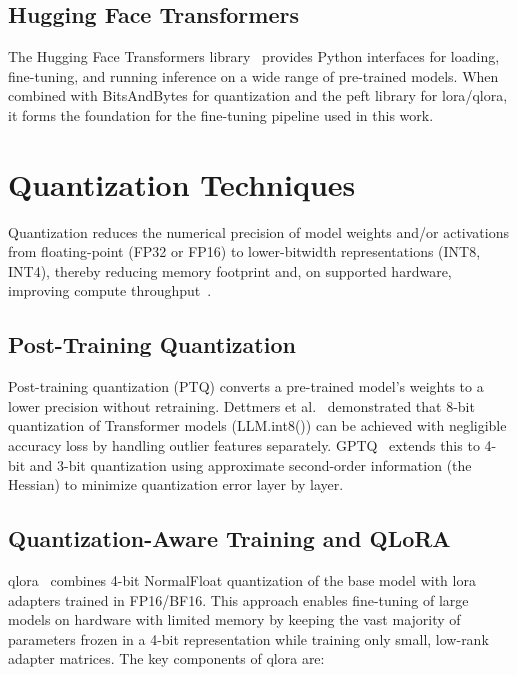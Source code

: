\documentclass[12pt,a4paper,oneside]{report}
\begin{document}
\subsection{Hugging Face Transformers}

The Hugging Face Transformers library~\cite{wolf2020transformers} provides Python interfaces for loading, fine-tuning, and running inference on a wide range of pre-trained models. When combined with BitsAndBytes for quantization and the \gls{peft} library for \gls{lora}/\gls{qlora}, it forms the foundation for the fine-tuning pipeline used in this work.


\section{Quantization Techniques}
\label{sec:sota-quantization}

Quantization reduces the numerical precision of model weights and/or activations from floating-point (FP32 or FP16) to lower-bitwidth representations (INT8, INT4), thereby reducing memory footprint and, on supported hardware, improving compute throughput~\cite{jacob2018quantization}.

\subsection{Post-Training Quantization}

Post-training quantization (PTQ) converts a pre-trained model's weights to a lower precision without retraining. Dettmers et al.~\cite{dettmers2022gpt3} demonstrated that 8-bit quantization of Transformer models (LLM.int8()) can be achieved with negligible accuracy loss by handling outlier features separately. GPTQ~\cite{frantar2023gptq} extends this to 4-bit and 3-bit quantization using approximate second-order information (the Hessian) to minimize quantization error layer by layer.

\subsection{Quantization-Aware Training and QLoRA}

\gls{qlora}~\cite{dettmers2023qlora} combines 4-bit NormalFloat quantization of the base model with \gls{lora} adapters trained in FP16/BF16. This approach enables fine-tuning of large models on hardware with limited memory by keeping the vast majority of parameters frozen in a 4-bit representation while training only small, low-rank adapter matrices. The key components of \gls{qlora} are:
\end{document}
